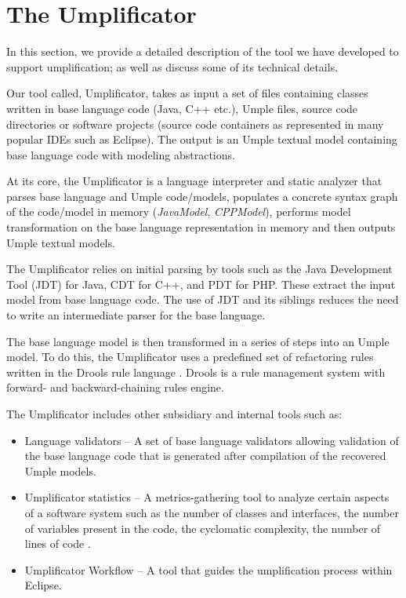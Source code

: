 \section{The Umplificator}
\label{chap:tool}
In this section, we provide a detailed description of the tool we have developed to support umplification; as well as discuss some of its technical details.

Our tool called, Umplificator, takes as input  a set of files containing classes written in base language code (Java, C++ etc.), Umple files, source code directories or software projects (source code containers as represented in many popular IDEs such as Eclipse). The output is an Umple textual model containing base language code with modeling abstractions.

At its core, the Umplificator is a language interpreter and static analyzer that parses base language and Umple code/models, populates a concrete syntax graph of the code/model in memory (\textit{JavaModel}, \textit{CPPModel}), performs model transformation on the base language representation in memory and then outputs Umple textual models.

The Umplificator relies on initial parsing by tools such as the Java Development Tool (JDT) for Java, CDT for C++, and PDT for PHP. These extract the input model from base language code. The use of JDT and its siblings reduces the need to write an intermediate parser for the base language.

The base language model is then transformed in a series of steps into an Umple model. To do this, the Umplificator uses a predefined set of refactoring rules written in the Drools rule language \cite{Drools_Book}. Drools is a rule management system with forward- and backward-chaining rules engine. 

The Umplificator includes other subsidiary and internal tools such as:
\begin{itemize}
\item Language validators – A set of base language validators allowing validation of the base language code that is generated after compilation of the recovered Umple models.
\item Umplificator statistics –  A metrics-gathering tool to analyze certain aspects of a software system such as the number of classes and interfaces, the  number of variables present in the code, the cyclomatic complexity, the number of lines of code \cite{MetricsBuse}.  
\item Umplificator Workflow – A tool that guides the umplification process within Eclipse.
\end{itemize}

